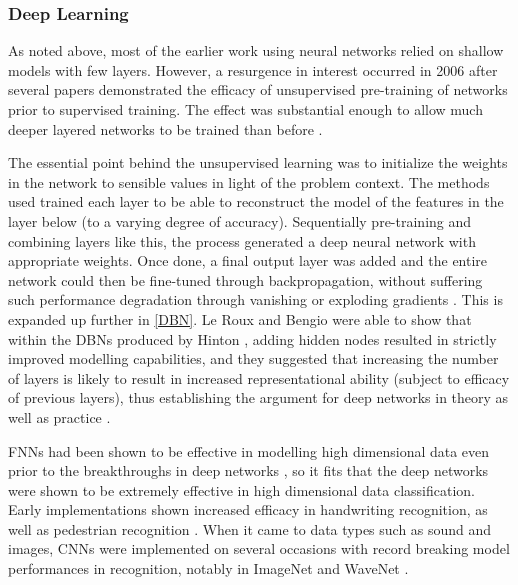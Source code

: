 \documentclass[a4paper,11pt,oneside]{article}
\theoremstyle{plain}
\theoremstyle{definition}
\begin{document}
\subsubsection{Deep Learning}

As noted above, most of the earlier work using neural networks relied on shallow models with few layers. 
However, a resurgence in interest occurred in 2006 after several papers demonstrated the efficacy of 
unsupervised pre-training of networks prior to supervised training. The effect was substantial enough to allow 
much deeper layered networks to be trained than before \cite{Bengio1, Hinton1}.
\hfill \break 
 
 The essential point behind the unsupervised learning was to initialize the weights in the network to sensible 
 values in light of the problem context. The methods used trained each layer to be able to reconstruct the model 
 of the features in the layer below (to a varying degree of accuracy). Sequentially pre-training and combining 
 layers like this, the process generated a deep neural network with appropriate weights. Once done, a final output 
 layer was added and the entire network could then be fine-tuned through backpropagation, without suffering 
 such performance degradation through vanishing or exploding gradients \cite{Hinton1, Ranzato1, Hinton2}. This is 
 expanded up further in \ref{DBN}. Le Roux and Bengio were able to show that within the DBNs produced by 
 Hinton \cite{Hinton1}, adding hidden nodes resulted in strictly improved modelling capabilities, and they suggested 
 that increasing the number of layers is likely to result in increased representational ability (subject to efficacy of 
 previous layers), thus establishing the argument for deep networks in theory as well as practice \cite{LeRoux}.
\hfill \break 

FNNs had been shown to be effective in modelling high dimensional data even prior to the breakthroughs in 
deep networks \cite{Bengio2}, so it fits that the deep networks were shown to be extremely effective in high dimensional 
data classification. Early implementations shown increased efficacy in handwriting recognition, as well as pedestrian 
recognition \cite{Sermanet}. When it came to data types such as sound and images, CNNs were implemented on several 
occasions with record breaking model performances in recognition, notably in ImageNet and WaveNet \cite{ImageNet, WaveNet}.
\hfill \break 
\end{document}
